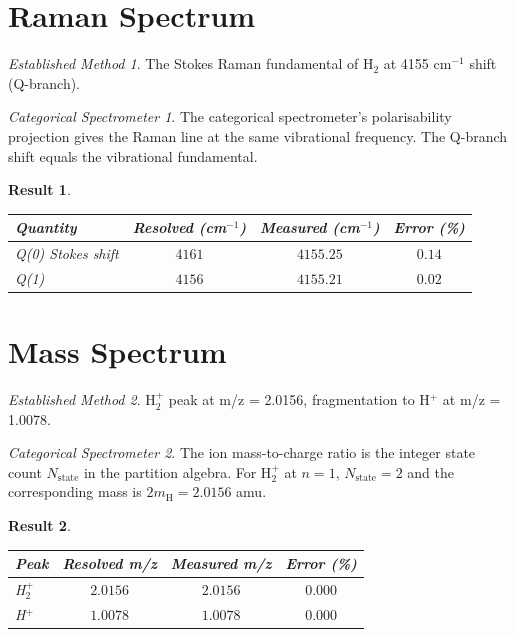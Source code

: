 \documentclass[11pt,a4paper]{article}
\theoremstyle{stmtstyle}
\newtheorem{result}{Result}
\theoremstyle{definition}
\theoremstyle{remark}
\newtheorem*{spectrometer}{Categorical Spectrometer}
\newtheorem*{established}{Established Method}
\begin{document}
\section{Raman Spectrum}
\label{sec:h2raman}

\begin{established}
The Stokes Raman fundamental of H$_{2}$ at 4155 cm$^{-1}$ shift (Q-branch).
\end{established}

\begin{spectrometer}
The categorical spectrometer's polarisability projection gives the Raman line at the same vibrational frequency. The Q-branch shift equals the vibrational fundamental.
\end{spectrometer}

\begin{result}\label{res:h2raman}
\begin{center}\small
\begin{tabular}{lccc}
\toprule
Quantity & Resolved (cm$^{-1}$) & Measured (cm$^{-1}$) & Error (\%)\\
\midrule
Q(0) Stokes shift & $4161$ & $4155.25$ & $0.14$\\
Q(1)              & $4156$ & $4155.21$ & $0.02$\\
\bottomrule
\end{tabular}
\end{center}
\end{result}

\section{Mass Spectrum}
\label{sec:h2ms}

\begin{established}
H$_{2}^{+}$ peak at m/z = 2.0156, fragmentation to H$^{+}$ at m/z = 1.0078.
\end{established}

\begin{spectrometer}
The ion mass-to-charge ratio is the integer state count $N_{\mathrm{state}}$ in the partition algebra. For H$_{2}^{+}$ at $n=1$, $N_{\mathrm{state}} = 2$ and the corresponding mass is $2 m_{\mathrm{H}} = 2.0156$ amu.
\end{spectrometer}

\begin{result}\label{res:h2ms}
\begin{center}\small
\begin{tabular}{lccc}
\toprule
Peak & Resolved m/z & Measured m/z & Error (\%)\\
\midrule
H$_{2}^{+}$ & $2.0156$ & $2.0156$ & $0.000$\\
H$^{+}$     & $1.0078$ & $1.0078$ & $0.000$\\
\bottomrule
\end{tabular}
\end{center}
\end{result}
\end{document}

